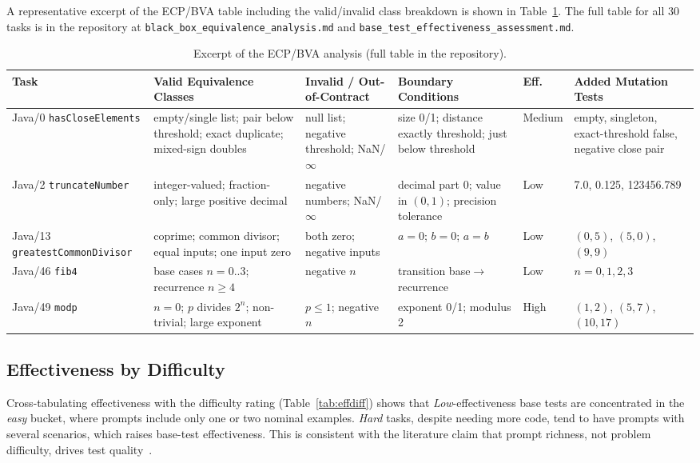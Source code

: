 \documentclass[journal]{IEEEtran}
\begin{document}
A representative excerpt of the ECP/BVA table including the
valid/invalid class breakdown is shown in
Table~\ref{tab:ecpsample}. The full table for all 30 tasks is
in the repository at
\texttt{black\_box\_equivalence\_analysis.md} and
\texttt{base\_test\_effectiveness\_assessment.md}.

\begin{table}[!t]
\centering
\caption{Excerpt of the ECP/BVA analysis (full table in the
repository).}
\label{tab:ecpsample}
\renewcommand{\arraystretch}{1.20}
\begin{tabular}{@{}p{}
                  p{}
                  p{}
                  p{}
                  p{}
                  p{}@{}}
\toprule
\textbf{Task}
 & \textbf{Valid Equivalence Classes}
 & \textbf{Invalid / Out-of-Contract}
 & \textbf{Boundary Conditions}
 & \textbf{Eff.}
 & \textbf{Added Mutation Tests} \\
\midrule
Java/0 \texttt{hasCloseElements}
 & empty/single list; pair below threshold; exact duplicate; mixed-sign doubles
 & null list; negative threshold; NaN/$\infty$
 & size 0/1; distance exactly threshold; just below threshold
 & Medium
 & empty, singleton, exact-threshold false, negative close pair \\
Java/2 \texttt{truncateNumber}
 & integer-valued; fraction-only; large positive decimal
 & negative numbers; NaN/$\infty$
 & decimal part 0; value in $(0,1)$; precision tolerance
 & Low
 & 7.0, 0.125, 123456.789 \\
Java/13 \texttt{greatestCommonDivisor}
 & coprime; common divisor; equal inputs; one input zero
 & both zero; negative inputs
 & $a{=}0$; $b{=}0$; $a{=}b$
 & Low
 & $(0,5)$, $(5,0)$, $(9,9)$ \\
Java/46 \texttt{fib4}
 & base cases $n{=}0..3$; recurrence $n{\geq}4$
 & negative $n$
 & transition base$\to$recurrence
 & Low
 & $n{=}0,1,2,3$ \\
Java/49 \texttt{modp}
 & $n{=}0$; $p$ divides $2^n$; non-trivial; large exponent
 & $p{\leq}1$; negative $n$
 & exponent 0/1; modulus 2
 & High
 & $(1,2)$, $(5,7)$, $(10,17)$ \\
\bottomrule
\end{tabular}
\end{table}

\subsection{Effectiveness by Difficulty}
Cross-tabulating effectiveness with the difficulty rating
(Table~\ref{tab:effdiff}) shows that \emph{Low}-effectiveness
base tests are concentrated in the \emph{easy} bucket, where
prompts include only one or two nominal examples.
\emph{Hard} tasks, despite needing more code, tend to have
prompts with several scenarios, which raises base-test
effectiveness. This is consistent with the literature claim
that prompt richness, not problem difficulty, drives test
quality~\cite{wang2024hits}.
\end{document}
